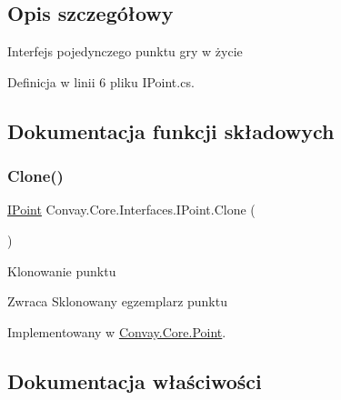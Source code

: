 \subsection{Opis szczegółowy}
Interfejs pojedynczego punktu gry w życie 



Definicja w linii 6 pliku I\+Point.\+cs.



\subsection{Dokumentacja funkcji składowych}
\hypertarget{interface_convay_1_1_core_1_1_interfaces_1_1_i_point_a4747dab5c78f8a41d079c15416825fcf}{}\label{interface_convay_1_1_core_1_1_interfaces_1_1_i_point_a4747dab5c78f8a41d079c15416825fcf} 
\subsubsection{\texorpdfstring{Clone()}{Clone()}}
{\footnotesize\ttfamily \hyperlink{interface_convay_1_1_core_1_1_interfaces_1_1_i_point}{I\+Point} Convay.\+Core.\+Interfaces.\+I\+Point.\+Clone (\begin{DoxyParamCaption}{ }\end{DoxyParamCaption})}



Klonowanie punktu 

\begin{DoxyReturn}{Zwraca}
Sklonowany egzemplarz punktu
\end{DoxyReturn}


Implementowany w \hyperlink{class_convay_1_1_core_1_1_point_a17444c52db4dd474a88abfd2a8d57e6d}{Convay.\+Core.\+Point}.



\subsection{Dokumentacja właściwości}
\hypertarget{interface_convay_1_1_core_1_1_interfaces_1_1_i_point_a0a36d897859f1277414d4acc77b3f037}{}\label{interface_convay_1_1_core_1_1_interfaces_1_1_i_point_a0a36d897859f1277414d4acc77b3f037} 
